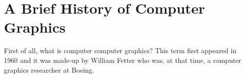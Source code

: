 \section{A Brief History of Computer Graphics}
First of all, what is computer computer graphics? This term first appeared in 1960 and it was made-up by William Fetter who was, at that time, a computer graphics researcher at Boeing.